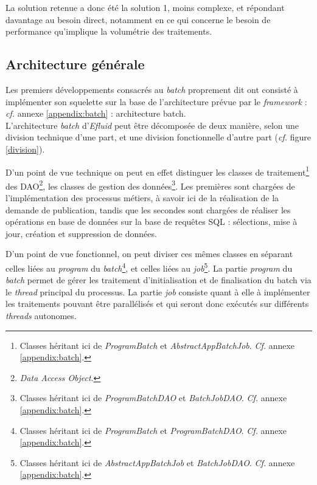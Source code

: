\documentclass[a4paper, 12pt]{report}
\begin{document}
La solution retenue a donc été la solution 1, moins complexe, et répondant davantage au besoin direct, notamment en ce qui concerne le besoin de performance qu’implique la volumétrie des traitements.

\subsection{Architecture générale}

Les premiers développements consacrés au \textit{batch} proprement dit ont consisté à implémenter son squelette sur la base de l'architecture prévue par le \textit{framework} : \textit{cf.} annexe \ref{appendix:batch} : architecture batch.\\

L'architecture \textit{batch} d'\textit{Efluid} peut être décomposée de deux manière, selon une division technique d'une part, et une division fonctionnelle d'autre part (\textit{cf.} figure \ref{division}).

D'un point de vue technique on peut en effet distinguer les classes de traitement\footnote{Classes héritant ici de \textit{ProgramBatch} et \textit{AbstractAppBatchJob}. \textit{Cf.} annexe \ref{appendix:batch}.} des DAO\footnote{\textit{Data Access Object}.}, les classes de gestion des données\footnote{Classes héritant ici de \textit{ProgramBatchDAO} et \textit{BatchJobDAO}. \textit{Cf.} annexe \ref{appendix:batch}.}. Les premières sont chargées de l'implémentation des processus métiers, à savoir ici de la réalisation de la demande de publication, tandis que les secondes sont chargées de réaliser les opérations en base de données sur la base de requêtes SQL : sélections, mise à jour, création et suppression de données.

D'un point de vue fonctionnel, on peut diviser ces mêmes classes en séparant celles liées au \textit{program} du \textit{batch}\footnote{Classes héritant ici de \textit{ProgramBatch} et \textit{ProgramBatchDAO}. \textit{Cf.} annexe \ref{appendix:batch}.}, et celles liées au \textit{job}\footnote{Classes héritant ici de \textit{AbstractAppBatchJob} et \textit{BatchJobDAO}. \textit{Cf.} annexe \ref{appendix:batch}.}. La partie \textit{program} du \textit{batch} permet de gérer les traitement d'initialisation et de finalisation du batch via le \textit{thread} principal du processus. La partie \textit{job} consiste quant à elle à implémenter les traitements pouvant être parallélisés et qui seront donc exécutés sur différents \textit{threads} autonomes.\\
\end{document}
